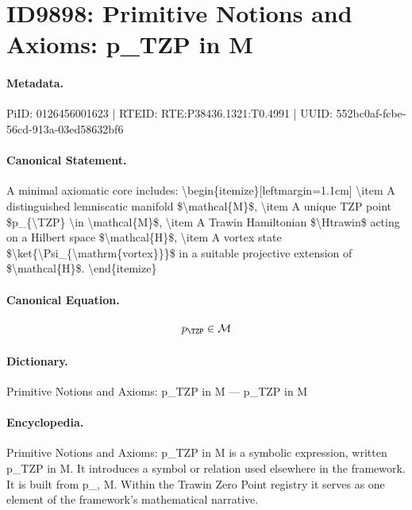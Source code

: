 \section*{ID9898: Primitive Notions and Axioms: p\_TZP in M}
\paragraph{Metadata.}
PiID: 0126456001623 | RTEID: RTE:P38436.1321:T0.4991 | UUID: 552bc0af-fcbe-56cd-913a-03ed58632bf6

\paragraph{Canonical Statement.}
A minimal axiomatic core includes: \textbackslash{}begin\{itemize\}[leftmargin=1.1cm] \textbackslash{}item A distinguished lemniscatic manifold \$\textbackslash{}mathcal\{M\}\$, \textbackslash{}item A unique TZP point \$p\_\{\textbackslash{}TZP\} \textbackslash{}in \textbackslash{}mathcal\{M\}\$, \textbackslash{}item A Trawin Hamiltonian \$\textbackslash{}Htrawin\$ acting on a Hilbert space \$\textbackslash{}mathcal\{H\}\$, \textbackslash{}item A vortex state \$\textbackslash{}ket\{\textbackslash{}Psi\_\{\textbackslash{}mathrm\{vortex\}\}\}\$ in a suitable projective extension of \$\textbackslash{}mathcal\{H\}\$. \textbackslash{}end\{itemize\}

\paragraph{Canonical Equation.}
\[
p_{\TZP} \in \mathcal{M}
\]

\paragraph{Dictionary.}
Primitive Notions and Axioms: p\_TZP in M — p\_TZP in M

\paragraph{Encyclopedia.}
Primitive Notions and Axioms: p\_TZP in M is a symbolic expression, written p\_TZP in M. It introduces a symbol or relation used elsewhere in the framework. It is built from p\_, M. Within the Trawin Zero Point registry it serves as one element of the framework's mathematical narrative.
